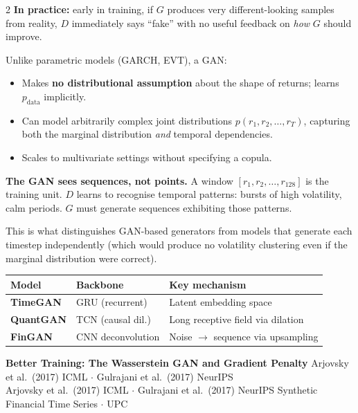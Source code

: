 \documentclass[10pt]{article}
\newcommand{\navybox}[2]{\begin{tcolorbox}[mybox={Navy}{LBg},title={#1}]#2\end{tcolorbox}}
\newcommand{\skybox}[2]{\begin{tcolorbox}[mybox={Sky}{BBg},title={#1}]#2\end{tcolorbox}}
\newcommand{\pagehead}[2]{%
  \begin{tcolorbox}[enhanced,arc=0pt,outer arc=0pt,boxrule=0pt,
    colback=Navy,colframe=Navy,
    top=5pt,bottom=5pt,left=8pt,right=8pt,
    before skip=0pt,after skip=10pt]
  {\color{white}\large\bfseries #1}%
  \ifx\relax#2\relax\else\\[1pt]{\color{blue!30!white}\small #2}\fi
  \hfill{\color{blue!20!white}\footnotesize Synthetic Financial Time Series $\cdot$ UPC}
  \end{tcolorbox}}
\begin{document}
\begin{multicols}{2}
{\textbf{In practice:} early in training, if $G$ produces very different-looking samples from reality, $D$ immediately says ``fake'' with no useful feedback on \emph{how} $G$ should improve.}

\columnbreak

\skybox{What Makes GANs Suitable for Financial Returns?}{%
Unlike parametric models (GARCH, EVT), a GAN:
\begin{itemize}
  \item Makes \textbf{no distributional assumption} about the shape of returns; learns $p_\text{data}$ implicitly.
  \item Can model arbitrarily complex joint distributions $p(r_1, r_2, \ldots, r_T)$, capturing both the marginal distribution \emph{and} temporal dependencies.
  \item Scales to multivariate settings without specifying a copula.
\end{itemize}

\textbf{The GAN sees sequences, not points.}
A window $[r_1, r_2, \ldots, r_{128}]$ is the training unit. $D$ learns to recognise temporal patterns: bursts of high volatility, calm periods. $G$ must generate sequences exhibiting those patterns.

This is what distinguishes GAN-based generators from models that generate each timestep independently (which would produce no volatility clustering even if the marginal distribution were correct).}

\navybox{Three Architectural Choices in This Benchmark}{%
\begin{center}
\renewcommand{\arraystretch}{1.4}
\begin{tabular}{@{}lll@{}}
\toprule
\textbf{Model} & \textbf{Backbone} & \textbf{Key mechanism} \\
\midrule
\textcolor{TGcol}{\textbf{TimeGAN}}  & GRU (recurrent)  & Latent embedding space \\
\textcolor{QGcol}{\textbf{QuantGAN}} & TCN (causal dil.) & Long receptive field via dilation \\
\textcolor{FGcol}{\textbf{FinGAN}}   & CNN deconvolution & Noise $\to$ sequence via upsampling \\
\bottomrule
\end{tabular}
\end{center}}

\end{multicols}

\clearpage

\pagehead{Better Training: The Wasserstein GAN and Gradient Penalty}
         {Arjovsky et al.\ (2017) ICML $\cdot$ Gulrajani et al.\ (2017) NeurIPS}
\end{document}

